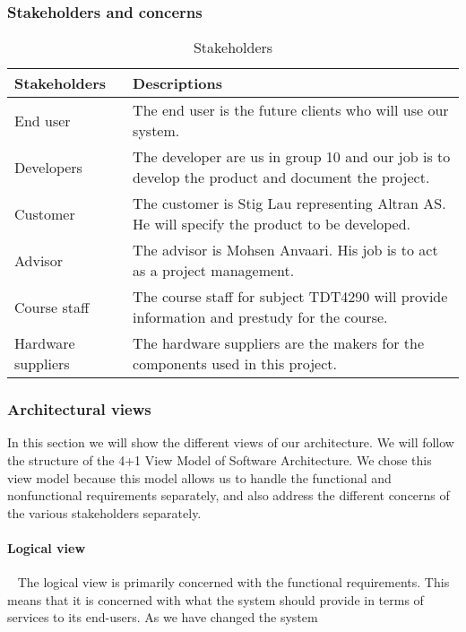 \documentclass[../document]{subfiles}
\begin{document}
\subsubsection{Stakeholders and concerns}
\begin{table}[H]
	\caption{Stakeholders}
	\begin{tabularx}{\textwidth}{|X|X|}
		\hline
		\textbf{Stakeholders}	& \textbf{Descriptions} \\ \hline
		End user				& The end user is the future clients who will use our system.  \\ \hline
		Developers				& The developer are us in group 10 and our job is to develop the product and document the project.  \\ \hline
		Customer				& The customer is Stig Lau representing Altran AS. He will specify the product to be developed.  \\ \hline
		Advisor					& The advisor is Mohsen Anvaari. His job is to act as a project management.  \\ \hline
		Course staff			& The course staff for subject TDT4290 will provide information and prestudy for the course.  \\ \hline
		Hardware suppliers		& The hardware suppliers are the makers for the components used in this project.  \\ \hline
	\end{tabularx}
\end{table}

\subsubsection{Architectural views}
In this section we will show the different views of our architecture. We will follow the structure of the 4+1 View Model of Software Architecture. We chose this view model because this model allows us to handle the functional and nonfunctional requirements separately, and also address the different concerns of the various stakeholders separately.

\paragraph{Logical view} \ \newline				
The logical view is primarily concerned with the functional requirements. This means that it is concerned with what the system should provide in terms of services to its end-users. As we have changed the system 
\end{document}
